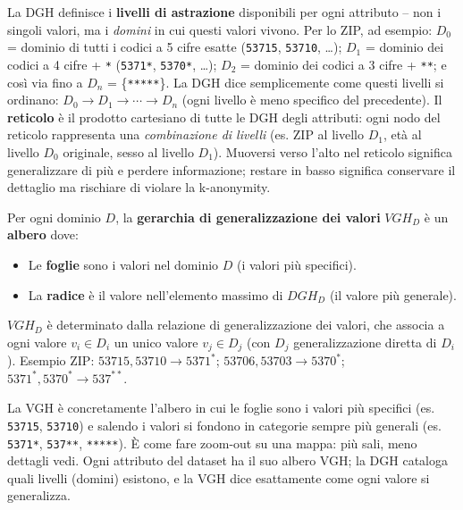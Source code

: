 \documentclass[a4paper,11pt]{article}
\begin{document}
\begin{nota}
La DGH definisce i \textbf{livelli di astrazione} disponibili per ogni attributo -- non i singoli valori, ma i \emph{domini} in cui questi valori vivono. Per lo ZIP, ad esempio: $D_0$ = dominio di tutti i codici a 5 cifre esatte (\texttt{53715}, \texttt{53710}, \ldots); $D_1$ = dominio dei codici a 4 cifre + \texttt{*} (\texttt{5371*}, \texttt{5370*}, \ldots); $D_2$ = dominio dei codici a 3 cifre + \texttt{**}; e così via fino a $D_n$ = \{\texttt{*****}\}. La DGH dice semplicemente come questi livelli si ordinano: $D_0 \to D_1 \to \cdots \to D_n$ (ogni livello è meno specifico del precedente). Il \textbf{reticolo} è il prodotto cartesiano di tutte le DGH degli attributi: ogni nodo del reticolo rappresenta una \emph{combinazione di livelli} (es. ZIP al livello $D_1$, età al livello $D_0$ originale, sesso al livello $D_1$). Muoversi verso l'alto nel reticolo significa generalizzare di più e perdere informazione; restare in basso significa conservare il dettaglio ma rischiare di violare la k-anonymity.
\end{nota}

\begin{definizione}
Per ogni dominio $D$, la \textbf{gerarchia di generalizzazione dei valori} $VGH_D$ \`{e} un \textbf{albero} dove:
\begin{itemize}
  \item Le \textbf{foglie} sono i valori nel dominio $D$ (i valori pi\`{u} specifici).
  \item La \textbf{radice} \`{e} il valore nell'elemento massimo di $DGH_D$ (il valore pi\`{u} generale).
\end{itemize}
$VGH_D$ \`{e} determinato dalla relazione di generalizzazione dei valori, che associa a ogni valore $v_i \in D_i$ un unico valore $v_j \in D_j$ (con $D_j$ generalizzazione diretta di $D_i$). Esempio ZIP: $53715, 53710 \to 5371^*$; $53706, 53703 \to 5370^*$; $5371^*, 5370^* \to 537^{**}$.
\end{definizione}

\begin{nota}
La VGH è concretamente l'albero in cui le foglie sono i valori più specifici (es. \texttt{53715}, \texttt{53710}) e salendo i valori si fondono in categorie sempre più generali (es. \texttt{5371*}, \texttt{537**}, \texttt{*****}). È come fare zoom-out su una mappa: più sali, meno dettagli vedi. Ogni attributo del dataset ha il suo albero VGH; la DGH cataloga quali livelli (domini) esistono, e la VGH dice esattamente come ogni valore si generalizza.
\end{nota}
\end{document}
